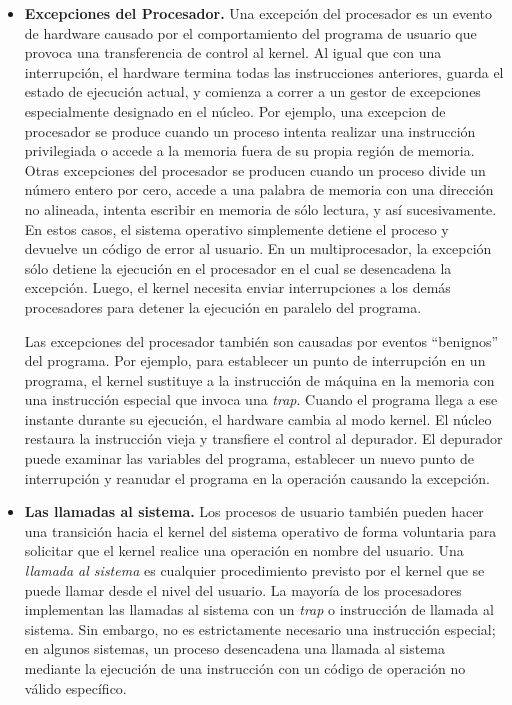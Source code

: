 \documentclass[10pt]{book}
\begin{document}
\begin{itemize}
\item \textbf{Excepciones del Procesador.} Una excepción del procesador es un evento de hardware causado por el comportamiento del programa de usuario que provoca una transferencia de control al kernel. Al igual que con una interrupción, el hardware termina todas las instrucciones anteriores, guarda el estado de ejecución actual, y comienza a correr a un gestor de excepciones especialmente designado en el núcleo. Por ejemplo, una excepcion de procesador se produce cuando un proceso intenta realizar una instrucción privilegiada o accede a la memoria fuera de su propia región de memoria. Otras excepciones del procesador se producen cuando un proceso divide un número entero  por cero, accede a una palabra de memoria con una dirección no alineada, intenta escribir en memoria de sólo lectura, y así sucesivamente. En estos casos, el sistema operativo simplemente detiene el proceso y devuelve un código de error al usuario. En un multiprocesador, la excepción sólo detiene la ejecución en el procesador en el cual se desencadena la excepción. Luego, el kernel necesita enviar interrupciones a los demás procesadores para detener la ejecución en paralelo del programa.

Las excepciones del procesador también son causadas por eventos ``benignos'' del programa. Por ejemplo, para establecer un punto de interrupción en un programa, el kernel sustituye a la instrucción de máquina en la memoria con una instrucción especial que invoca una \textit{trap}. Cuando el programa llega a ese instante durante su ejecución, el hardware cambia al modo kernel. El núcleo restaura la instrucción vieja y transfiere el control al depurador. El depurador puede examinar las variables del programa, establecer un nuevo punto de interrupción y reanudar el programa en la operación causando la excepción.

\item \textbf{Las llamadas al sistema.} Los procesos de usuario también pueden hacer una transición hacia el kernel del sistema operativo de forma voluntaria para solicitar que el kernel realice una operación en nombre del usuario. Una \textit{llamada al sistema} es cualquier procedimiento previsto por el kernel que se puede llamar desde el nivel del usuario. La mayoría de los procesadores implementan las llamadas al sistema con un \textit{trap} o instrucción de llamada al sistema. Sin embargo, no es estrictamente necesario una instrucción especial; en algunos sistemas, un proceso desencadena una llamada al sistema mediante la ejecución de una instrucción con un código de operación no válido específico.


\end{itemize}
\end{document}
